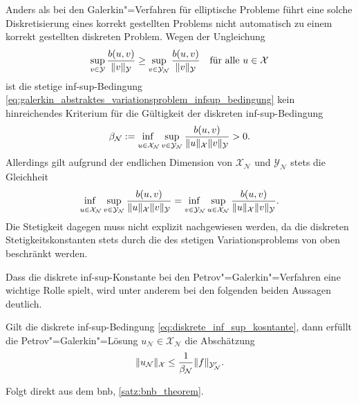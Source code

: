 \documentclass[../main.tex]{subfiles}
\begin{document}
\begin{Bemerkung}\label{bemerkung:zur_wohldefiniertheit}
    Anders als bei den Galerkin"=Verfahren für elliptische Probleme führt eine solche Diskretisierung eines korrekt gestellten Problems nicht automatisch zu einem korrekt gestellten diskreten Problem.
    Wegen der Ungleichung
    \begin{equation}
        \sup_{v \in \mathcal Y} \frac{b(u, v)}{\norm{v}_{\mathcal Y}} \geq \sup_{v \in \mathcal Y_{\mathcal N}} \frac{b(u, v)}{\norm{v}_{\mathcal Y}} \quad \fa u \in \mathcal X
    \end{equation}
    ist die stetige inf-sup-Bedingung \cref{eq:galerkin_abstraktes_variationsproblem_infsup_bedingung} kein hinreichendes Kriterium für die Gültigkeit der diskreten inf-sup-Bedingung
    \begin{equation}\label{eq:diskrete_inf_sup_kosntante}
        \beta_{\mathcal N} := \infsup{u \in \mathcal X_{\mathcal N}}{v \in \mathcal Y_{\mathcal N}} \frac{b(u, v)}{\norm{u}_{\mathcal X} \norm{v}_{\mathcal Y}} > 0.
    \end{equation}
    Allerdings gilt aufgrund der endlichen Dimension von $\mathcal X_{\mathcal N}$ und $\mathcal Y_{\mathcal N}$ stets die Gleichheit
    \begin{equation}
        \infsup{u \in \mathcal X_{\mathcal N}}{v \in \mathcal Y_{\mathcal N}} \frac{b(u, v)}{\norm{u}_{\mathcal X} \norm{v}_{\mathcal Y}} = \infsup{v \in \mathcal Y_{\mathcal N}}{u \in \mathcal X_{\mathcal N}} \frac{b(u, v)}{\norm{u}_{\mathcal X} \norm{v}_{\mathcal Y}}.
    \end{equation}
    Die Stetigkeit dagegen muss nicht explizit nachgewiesen werden, da die diskreten Stetigkeitskonstanten stets durch die des stetigen Variationsproblems von oben beschränkt werden.
\end{Bemerkung}

Dass die diskrete inf-sup-Konstante bei den Petrov"=Galerkin"=Verfahren eine wichtige Rolle spielt, wird unter anderem bei den folgenden beiden Aussagen deutlich.

\begin{Satz}\label{satz:galerkin_stabilitaet}
    Gilt die diskrete inf-sup-Bedingung \cref{eq:diskrete_inf_sup_kosntante}, dann erfüllt die Petrov"=Galerkin"=Lösung $u_{\mathcal N} \in \mathcal X_{\mathcal N}$ die Abschätzung
    \begin{equation}\label{eq:galerkin_statibilitaet}
        \norm{u_{\mathcal N}}_{\mathcal X} \leq \frac{1}{\beta_{\mathcal N}} \norm{f}_{\mathcal Y_{\mathcal N}'}.
    \end{equation}

    \begin{Beweis}
        Folgt direkt aus dem \acl{bnb}, \cref{satz:bnb_theorem}.
    \end{Beweis}
\end{Satz}
\end{document}

